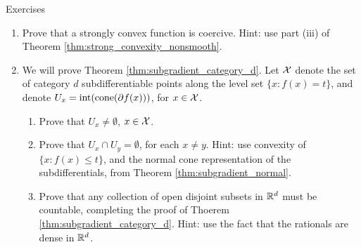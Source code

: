 \begin{xcb}{Exercises}
\begin{enumerate}[label=\thechapter.\arabic*]
\item \label{ex:strong_convexity_coercive}
  Prove that a strongly convex function is coercive. Hint: use part (iii) of
  Theorem \ref{thm:strong_convexity_nonsmooth}.  




\item \label{ex:subgradient_category_d}
  We will prove Theorem \ref{thm:subgradient_category_d}. Let $\mathcal{X}$ denote the
  set of category $d$ subdifferentiable points along the level set $\{x : f(x) =
  t\}$, and denote $U_x = \operatorname{int}(\operatorname{cone}(\partial f(x)))$, for $x \in \mathcal{X}$. 

\begin{enumerate}[label=\alph*.]
\item Prove that $U_x \not= \emptyset$, $x \in \mathcal{X}$.

\item Prove that $U_x \cap U_y = \emptyset$, for each $x \not= y$. Hint: use
  convexity of $\{x : f(x) \leq t\}$, and the normal cone representation of the 
  subdifferentials, from Theorem \ref{thm:subgradient_normal}.    

\item Prove that any collection of open disjoint subsets in $\mathbb{R}^d$ must be 
  countable, completing the proof of Thoerem
  \ref{thm:subgradient_category_d}. Hint: use the fact that the rationals are
  dense in $\mathbb{R}^d$.
\end{enumerate}

\end{enumerate}
\end{xcb}